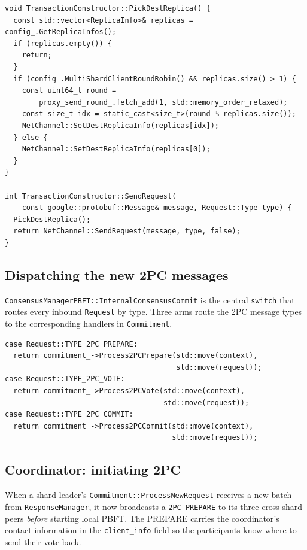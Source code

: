 \documentclass[11pt]{article}
\begin{document}
\begin{lstlisting}[style=cppstyle,caption={\texttt{interface/rdbc/transaction\_constructor.cpp} -- proxy round-robin across shard leaders.}]
void TransactionConstructor::PickDestReplica() {
  const std::vector<ReplicaInfo>& replicas = config_.GetReplicaInfos();
  if (replicas.empty()) {
    return;
  }
  if (config_.MultiShardClientRoundRobin() && replicas.size() > 1) {
    const uint64_t round =
        proxy_send_round_.fetch_add(1, std::memory_order_relaxed);
    const size_t idx = static_cast<size_t>(round % replicas.size());
    NetChannel::SetDestReplicaInfo(replicas[idx]);
  } else {
    NetChannel::SetDestReplicaInfo(replicas[0]);
  }
}

int TransactionConstructor::SendRequest(
    const google::protobuf::Message& message, Request::Type type) {
  PickDestReplica();
  return NetChannel::SendRequest(message, type, false);
}
\end{lstlisting}

\subsection{Dispatching the new 2PC messages}

\texttt{ConsensusManagerPBFT::InternalConsensusCommit} is the central
\texttt{switch} that routes every inbound \texttt{Request} by type.
Three arms route the 2PC message types to the corresponding handlers in
\texttt{Commitment}.

\begin{lstlisting}[style=cppstyle,caption={\texttt{platform/consensus/ordering/pbft/consensus\_manager\_pbft.cpp} -- new dispatcher arms for the 2PC types.}]
case Request::TYPE_2PC_PREPARE:
  return commitment_->Process2PCPrepare(std::move(context),
                                        std::move(request));
case Request::TYPE_2PC_VOTE:
  return commitment_->Process2PCVote(std::move(context),
                                     std::move(request));
case Request::TYPE_2PC_COMMIT:
  return commitment_->Process2PCCommit(std::move(context),
                                       std::move(request));
\end{lstlisting}

\subsection{Coordinator: initiating 2PC}

When a shard leader's \texttt{Commitment::ProcessNewRequest} receives a new
batch from \texttt{ResponseManager}, it now broadcasts a \texttt{2PC PREPARE}
to its three cross-shard peers \emph{before} starting local PBFT. The
PREPARE carries the coordinator's contact information in the
\texttt{client\_info} field so the participants know where to send their
vote back.
\end{document}
